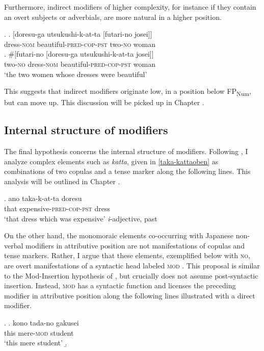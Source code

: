 \documentclass [output=book,colorlinks,citecolor=brown]{langscibook}
\begin{document}
Furthermore, indirect modifiers of higher complexity, for instance if they contain an overt subjects or adverbials, are more natural in a higher position.

\ex. \ag. [doresu-ga utsukushi-k-at-ta [futari-no josei]]\\
dress-\textsc{nom} beautiful-\textsc{pred-cop-pst} two-\textsc{no} woman\\
\bg. \#[futari-no [doresu-ga utsukushi-k-at-ta josei]]\\
two-\textsc{no} dress-\textsc{nom} beautiful-\textsc{pred-cop-pst} woman\\
`the two women whose dresses were beautiful'

This suggests that indirect modifiers originate low, in a position below FP\textsubscript{Num}, but can move up. This discussion will be picked up in Chapter .

\subsection{Internal structure of modifiers}

The final hypothesis concerns the internal structure of modifiers. Following \citet{nishiyama:1999:adj}, I analyze complex elements such as \textit{katta}, given in \ref{taka-kattaoben} as combinations of two copulas and a tense marker along the following lines. This analysis will be outlined in Chapter . %

\exg. ano taka-k-at-ta doresu\\
that expensive-\textsc{pred-cop-pst} dress\\
`that dress which was expensive' \null \hfill \textit{i}-adjective, past

On the other hand, the monomoraic elements co-occurring with Japanese non-verbal modifiers in attributive position are not manifestations of copulas and tense markers. Rather, I argue that these elements, exemplified below with \textsc{no}, are overt manifestations of a syntactic head labeled \textsc{mod} \citep{rubin:1994:mod}. This proposal is similar to the Mod-Insertion hypothesis of \citet{kitagawa:1982:prenominal}, but crucially does not assume post-syntactic insertion. Instead, \textsc{mod} has a syntactic function and licenses the preceding modifier in attributive position along the following lines illustrated with a direct modifier.

\newpage

\ex. \label{tadanogakuseitree} \ag. kono tada-no gakusei\\
this mere-\textsc{mod} student\\
`this mere student’
\b. 
\end{document}
